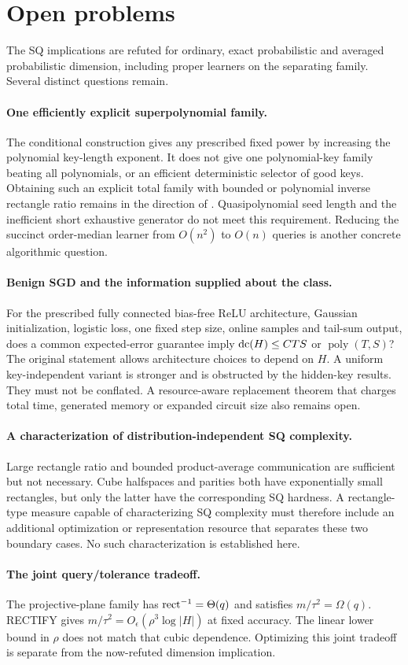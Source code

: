 \clearpage
\section{Open problems}
The SQ implications are refuted for ordinary, exact probabilistic and averaged probabilistic dimension, including proper learners on the separating family. Several distinct questions remain.

\paragraph{One efficiently explicit superpolynomial family.}
The conditional construction gives any prescribed fixed power by increasing the polynomial key-length exponent. It does not give one polynomial-key family beating all polynomials, or an efficient deterministic selector of good keys. Obtaining such an explicit total family with bounded or polynomial inverse rectangle ratio remains in the direction of \citet[Problem~4.1]{HHPTZ22}. Quasipolynomial seed length and the inefficient short exhaustive generator do not meet this requirement. Reducing the succinct order-median learner from $O(n^2)$ to $O(n)$ queries is another concrete algorithmic question.

\paragraph{Benign SGD and the information supplied about the class.}
For the prescribed fully connected bias-free ReLU architecture, Gaussian initialization, logistic loss, one fixed step size, online samples and tail-sum output, does a common expected-error guarantee imply $\operatorname{dc}(H)\le CTS$ or $\operatorname{poly}(T,S)$? The original statement allows architecture choices to depend on $H$. A uniform key-independent variant is stronger and is obstructed by the hidden-key results. They must not be conflated. A resource-aware replacement theorem that charges total time, generated memory or expanded circuit size also remains open.

\paragraph{A characterization of distribution-independent SQ complexity.}
Large rectangle ratio and bounded product-average communication are sufficient but not necessary. Cube halfspaces and parities both have exponentially small rectangles, but only the latter have the corresponding SQ hardness. A rectangle-type measure capable of characterizing SQ complexity must therefore include an additional optimization or representation resource that separates these two boundary cases. No such characterization is established here.

\paragraph{The joint query/tolerance tradeoff.}
The projective-plane family has $\operatorname{rect}^{-1}=\Theta(q)$ and satisfies $m/\tau^2=\Omega(q)$. RECTIFY gives $m/\tau^2=O_\epsilon(\rho^3\log|H|)$ at fixed accuracy. The linear lower bound in $\rho$ does not match that cubic dependence. Optimizing this joint tradeoff is separate from the now-refuted dimension implication.
